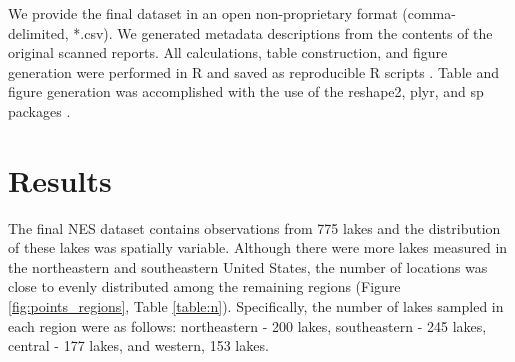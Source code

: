 \documentclass[journal abbreviations, manuscript]{copernicus}
\begin{document}
We provide the final dataset in an open non-proprietary format (comma-delimited, *.csv).  We generated metadata descriptions from the contents of the original scanned reports. All calculations, table construction, and figure generation were performed in R and saved as reproducible R scripts \citep{R-core}. Table and figure generation was accomplished with the use of the reshape2, plyr, and sp packages \citep{R-plyr,R-sp}.

\section{Results}

The final NES dataset contains observations from 775 lakes and the distribution of these lakes was spatially variable. Although there were more lakes measured in the northeastern and southeastern United States, the number of locations was close to evenly distributed among the remaining regions (Figure \ref{fig:points_regions}, Table \ref{table:n}). Specifically, the number of lakes sampled in each region were as follows: northeastern - 200 lakes, southeastern - 245 lakes, central - 177 lakes, and western, 153 lakes. 
\end{document}
